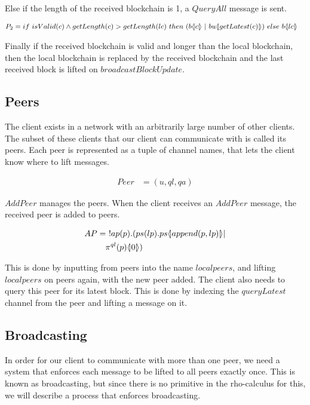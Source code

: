 Else if the length of the received blockchain is 1, a $QueryAll$ message is sent.

\begin{align*}
	P_2 &= if\ isValid(c) \land getLength(c) > getLength(lc)\ then\  (b\lift{}{c}\ |\ bu \lift{}{getLatest(c)})\ else\ b\lift{}{lc}
\end{align*}

Finally if the received blockchain is valid and longer than the local blockchain, then the local blockchain is replaced by the received blockchain and the last received block is lifted on $broadcastBlockUpdate$.

\subsection{Peers}
The client exists in a network with an arbitrarily large number of other clients.
The subset of these clients that our client can communicate with is called its peers.
Each peer is represented as a tuple of channel names, that lets the client know where to lift messages.

\begin{align*}
    Peer &= (u, ql, qa)
\end{align*}

$AddPeer$ manages the peers.
When the client receives an $AddPeer$ message, the received peer is added to peers.

\begin{align*}
    AP &=\ !ap(p).(ps(lp).ps \langle \! | append(p,lp) | \! \rangle|\\
        &\quad \pi^{ql}(p) \langle \! | 0 | \! \rangle)\\
\end{align*}

This is done by inputting from peers into the name $localpeers$, and lifting $localpeers$ on peers again, with the new peer added.
The client also needs to query this peer for its latest block.
This is done by indexing the $queryLatest$ channel from the peer and lifting a message on it.

\subsection{Broadcasting} \label{broadcast}
In order for our client to communicate with more than one peer, we need a system that enforces each message to be lifted to all peers exactly once.
This is known as broadcasting, but since there is no primitive in the rho-calculus for this, we will describe a process that enforces broadcasting.

